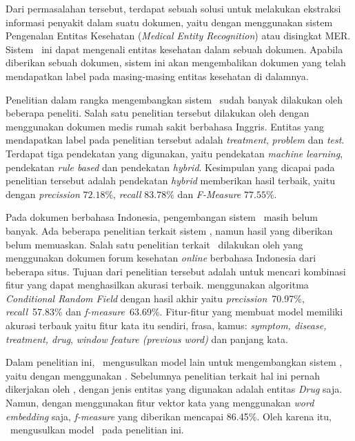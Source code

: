 	Dari permasalahan tersebut, terdapat sebuah solusi untuk melakukan ekstraksi informasi penyakit dalam suatu dokumen, yaitu dengan menggunakan sistem Pengenalan Entitas Kesehatan (\textit{Medical Entity Recognition}) atau disingkat MER. Sistem \mer~ini dapat mengenali entitas kesehatan dalam sebuah dokumen. Apabila diberikan sebuah dokumen, sistem ini akan mengembalikan dokumen yang telah mendapatkan label pada masing-masing entitas kesehatan di dalamnya.
	
	Penelitian dalam rangka mengembangkan sistem \mer~sudah banyak dilakukan oleh beberapa peneliti. Salah satu penelitian tersebut dilakukan oleh \cite{abacha2011medical} dengan menggunakan dokumen medis rumah sakit berbahasa Inggris. Entitas yang mendapatkan label pada penelitian tersebut adalah \textit{treatment}, \textit{problem} dan \textit{test}. Terdapat tiga pendekatan yang digunakan, yaitu pendekatan \textit{machine learning}, pendekatan \textit{rule based} dan pendekatan \textit{hybrid}. Kesimpulan yang dicapai pada penelitian tersebut adalah pendekatan \textit{hybrid} memberikan hasil terbaik, yaitu dengan \textit{precission} $ 72.18\% $, \textit{recall} $ 83.78\% $ dan \textit{F-Measure} $ 77.55\% $.
		
	Pada dokumen berbahasa Indonesia, pengembangan sistem \mer~masih belum banyak. Ada beberapa penelitian terkait sistem \mer, namun hasil yang diberikan belum memuaskan. Salah satu penelitian terkait \mer~dilakukan oleh \cite{skripsiKakRadit} yang menggunakan dokumen forum kesehatan \textit{online} berbahasa Indonesia dari beberapa situs. Tujuan dari penelitian tersebut adalah untuk mencari kombinasi fitur yang dapat menghasilkan akurasi terbaik. \cite{skripsiKakRadit} menggunakan algoritma \textit{Conditional Random Field} dengan hasil akhir yaitu \textit{precission}~70.97\%, \textit{recall}~57.83\% dan \textit{f-measure}~63.69\%. Fitur-fitur yang membuat model memiliki akurasi terbauk yaitu fitur kata itu sendiri, frasa, kamus: \textit{symptom, disease, treatment, drug}, \textit{window feature (previous word)} dan panjang kata.

	Dalam penelitian ini, \saya~mengusulkan model lain untuk mengembangkan sistem \mer, yaitu dengan menggunakan \rnn. Sebelumnya penelitian terkait hal ini pernah dikerjakan oleh \cite{mujiono2016new}, dengan jenis entitas yang digunakan adalah entitas \textit{Drug} saja. Namun, dengan menggunakan fitur vektor kata yang menggunakan \textit{word embedding} saja, \textit{f-measure} yang diberikan mencapai 86.45\%. Oleh karena itu, \saya~mengusulkan model \rnn~pada penelitian ini.
		
